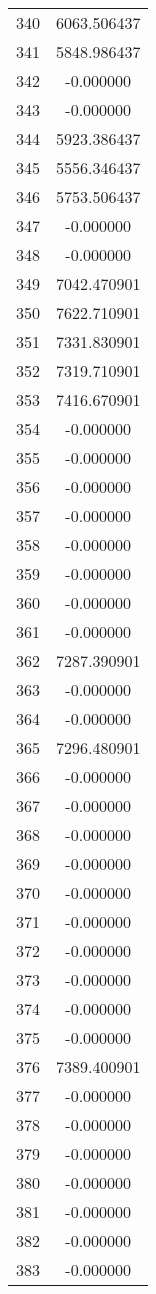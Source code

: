 \documentclass[12pt]{article}
\begin{document}
\begin{longtable}{@{}cc@{}}
340 & 6063.506437 \\
341 & 5848.986437 \\
342 & -0.000000 \\
343 & -0.000000 \\
344 & 5923.386437 \\
345 & 5556.346437 \\
346 & 5753.506437 \\
347 & -0.000000 \\
348 & -0.000000 \\
349 & 7042.470901 \\
350 & 7622.710901 \\
351 & 7331.830901 \\
352 & 7319.710901 \\
353 & 7416.670901 \\
354 & -0.000000 \\
355 & -0.000000 \\
356 & -0.000000 \\
357 & -0.000000 \\
358 & -0.000000 \\
359 & -0.000000 \\
360 & -0.000000 \\
361 & -0.000000 \\
362 & 7287.390901 \\
363 & -0.000000 \\
364 & -0.000000 \\
365 & 7296.480901 \\
366 & -0.000000 \\
367 & -0.000000 \\
368 & -0.000000 \\
369 & -0.000000 \\
370 & -0.000000 \\
371 & -0.000000 \\
372 & -0.000000 \\
373 & -0.000000 \\
374 & -0.000000 \\
375 & -0.000000 \\
376 & 7389.400901 \\
377 & -0.000000 \\
378 & -0.000000 \\
379 & -0.000000 \\
380 & -0.000000 \\
381 & -0.000000 \\
382 & -0.000000 \\
383 & -0.000000 \\

\end{longtable}
\end{document}
